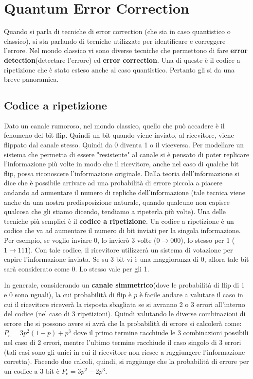 \section{Quantum Error Correction}
Quando si parla di tecniche di error correction (che sia in caso quantistico o classico), si sta parlando di tecniche utilizzate per identificare e correggere l'errore. Nel mondo classico vi sono diverse tecniche che permettono di fare \textbf{error detection}(detectare l'errore) ed \textbf{error correction}. Una di queste è il codice a ripetizione che è stato esteso anche al caso quantistico. Pertanto gli si da una breve panoramica.

\subsection{Codice a ripetizione}
Dato un canale rumoroso, nel mondo classico, quello che può accadere è il fenomeno del bit flip. Quindi un bit quando viene inviato, al ricevitore, viene flippato dal canale stesso. Quindi da 0 diventa 1 o il viceversa.
Per modellare un sistema che permetta di essere "resistente" al canale si è pensato di poter replicare l'informazione più volte in modo che il ricevitore, anche nel caso di qualche bit flip, possa riconoscere l'informazione originale. Dalla teoria dell'informazione si dice che è possibile arrivare ad una probabilità di errore piccola a piacere andando ad aumentare il numero di repliche dell'informazione (tale tecnica viene anche da una nostra predisposizione naturale, quando qualcuno non capisce qualcosa che gli stiamo dicendo, tendiamo a ripeterla più volte). Una delle tecniche più semplici è il \textbf{codice a ripetizione}. Un codice a ripetizione è un codice che va ad aumentare il numero di bit inviati per la singola informazione. Per esempio, se voglio inviare 0, lo invierò 3 volte (\(0 \rightarrow 000\)), lo stesso per 1 (\(1 \rightarrow 111\)). Con tale codice, il ricevitore utilizzerà un sistema di votazione per capire l'informazione inviata. Se su 3 bit vi è una maggioranza di 0, allora tale bit sarà considerato come 0. Lo stesso vale per gli 1.

In generale, considerando un \textbf{canale simmetrico}(dove le probabilità di flip di 1 e 0 sono uguali), la cui probabilità di flip è \(p\) è facile andare a valutare il caso in cui il ricevitore riceverà la risposta sbagliata se si avranno 2 o 3 errori all'interno del codice (nel caso di 3 ripetizioni). Quindi valutando le diverse combinazioni di errore che si possono avere si avrà che la probabilità di errore si calcolerà come: \(P_e = 3 p^2 (1 - p) + p^3\) dove il primo termine racchiude le 3 combinazioni possibili nel caso di 2 errori, mentre l'ultimo termine racchiude il caso singolo di 3 errori (tali casi sono gli unici in cui il ricevitore non riesce a raggiungere l'informazione corretta). Facendo due calcoli, quindi, si raggiunge che la probabilità di errore per un codice a 3 bit è \(P_e = 3 p^2 - 2 p^3\).

